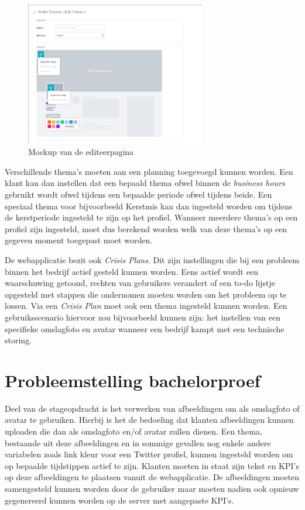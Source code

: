 \begin{figure}[H]
	\centering
	\includegraphics[width=0.7\textwidth]{Figuren/EditThemeMockup.png}
	\caption{Mockup van de editeerpagina \cite{EditThemeMockup}} %
	\label{fig:EditTheme}
\end{figure} 

Verschillende thema's moeten aan een planning toegevoegd kunnen worden. Een klant kan dan instellen dat een bepaald thema ofwel binnen de \textit{business hours} gebruikt wordt ofwel tijdens een bepaalde periode ofwel tijdens beide. Een speciaal thema voor bijvoorbeeld Kerstmis kan dan ingesteld worden om tijdens de kerstperiode ingesteld te zijn op het profiel. Wanneer meerdere thema's op een profiel zijn ingesteld, moet dus berekend worden welk van deze thema's op een gegeven moment toegepast moet worden. 

\newpage
De webapplicatie bezit ook \textit{Crisis Plans}. Dit zijn instellingen die bij een probleem binnen het bedrijf actief gesteld kunnen worden. Eens actief wordt een waarschuwing getoond, rechten van gebruikers verandert of een to-do lijstje opgesteld met stappen die ondernomen moeten worden om het probleem op te lossen. Via een \textit{Crisis Plan} moet ook een thema ingesteld kunnen worden. Een gebruiksscenario hiervoor zou bijvoorbeeld kunnen zijn: het instellen van een specifieke omslagfoto en avatar wanneer een bedrijf kampt met een technische storing. 

\section{Probleemstelling bachelorproef}

Deel van de stageopdracht is het verwerken van afbeeldingen om als omslagfoto of avatar te gebruiken. Hierbij is het de bedoeling dat klanten afbeeldingen kunnen uploaden die dan als omslagfoto en/of avatar zullen dienen. Een thema, bestaande uit deze afbeeldingen en in sommige gevallen nog enkele andere variabelen zoals link kleur voor een Twitter profiel, kunnen ingesteld worden om op bepaalde tijdstippen actief te zijn. Klanten moeten in staat zijn tekst en KPI's op deze afbeeldingen te plaatsen vanuit de webapplicatie. De afbeeldingen moeten samengesteld kunnen worden door de gebruiker maar moeten nadien ook opnieuw gegenereerd kunnen worden op de server met aangepaste KPI's. 

